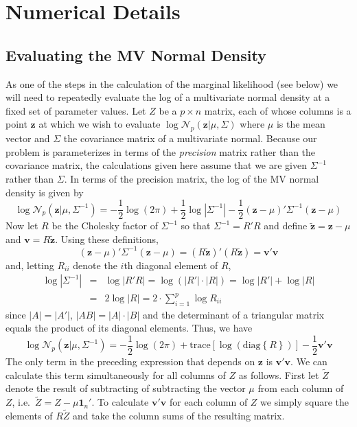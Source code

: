 \documentclass[12pt]{article}
\begin{document}
\section{Numerical Details}

\subsection{Evaluating the MV Normal Density}
As one of the steps in the calculation of the marginal likelihood (see below) we will need to repeatedly evaluate the log of a multivariate normal density at a fixed set of parameter values.
Let $Z$ be a $p\times n$ matrix, each of whose columns is a point $\mathbf{z}$ at which we wish to evaluate 
$\log {\mathcal{N}_p\left(\mathbf{z}|\mu, \Sigma \right)}$
where $\mu$ is the mean vector and $\Sigma$ the covariance matrix of a multivariate normal.
Because our problem is parameterizes in terms of the \emph{precision} matrix rather than the covariance matrix, the calculations given here assume that we are given $\Sigma^{-1}$ rather than $\Sigma$.
In terms of the precision matrix, the log of the MV normal density is given by
\begin{equation*}
  \log {\mathcal{N}_p\left(\mathbf{z}|\mu, \Sigma^{-1} \right)} = -\frac{1}{2}\log\left( 2\pi \right) + \frac{1}{2} \log \left| \Sigma^{-1} \right| - \frac{1}{2} \left(\mathbf{z} - \mu \right)' \Sigma^{-1} \left( \mathbf{z} - \mu \right)
\end{equation*}
Now let $R$ be the Cholesky factor of $\Sigma^{-1}$ so that $\Sigma^{-1} = R'R$ and define $\tilde{\mathbf{z}} = \mathbf{z} - \mu$ and $\mathbf{v} = R\tilde{\mathbf{z}}$.
Using these definitions,
\begin{equation*}
  \left( \mathbf{z} - \mu \right)' \Sigma^{-1} \left( \mathbf{z} - \mu \right) = (R\tilde{\mathbf{z}})'(R\tilde{\mathbf{z}}) = \mathbf{v}' \mathbf{v}
\end{equation*}
and, letting $R_{ii}$ denote the $i$th diagonal element of $R$,
\begin{eqnarray*}
  \log |\Sigma^{-1}| &=&  \log |R'R| = \log\left(|R'| \cdot |R|\right) = \log |R'| + \log |R| \\
  &=& 2 \log|R| = 2 \cdot \sum_{i=1}^{p} \log R_{ii}
\end{eqnarray*} 
since $|A| = |A'|$, $|AB| = |A| \cdot |B|$ and the determinant of a triangular matrix equals the product of its diagonal elements.
Thus, we have
\begin{equation*}
  \log {\mathcal{N}_p\left(\mathbf{z}|\mu, \Sigma^{-1} \right)} = -\frac{1}{2}\log\left( 2\pi \right) + \mbox{trace}\left[\log \left(\mbox{diag}\left\{R  \right\}  \right)\right] - \frac{1}{2} \mathbf{v}'\mathbf{v}
\end{equation*}
The only term in the preceding expression that depends on $\mathbf{z}$ is $\mathbf{v}'\mathbf{v}$.
We can calculate this term simultaneously for all columns of $Z$ as follows.
First let $\widetilde{Z}$ denote the result of subtracting of subtracting the vector $\mu$ from each column of $Z$, i.e.\ $\widetilde{Z} = Z - \mu \mathbf{1}_n'$.
To calculate $\mathbf{v}'\mathbf{v}$ for each column of $Z$ we simply square the elements of $R\widetilde{Z}$ and take the column sums of the resulting matrix.
\end{document}
